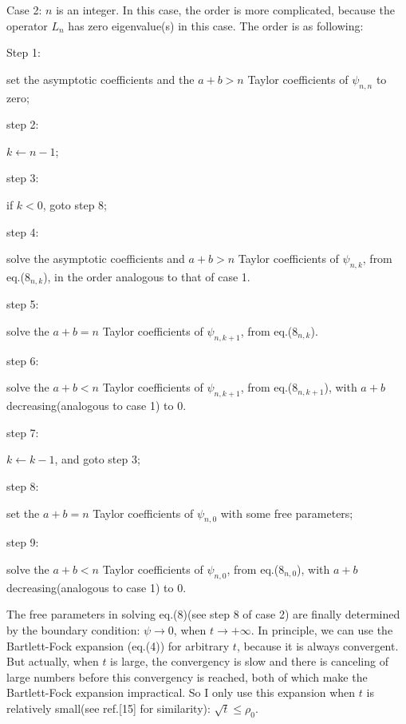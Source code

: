 Case 2: $n$ is an integer. In this case, the order is more complicated,
because the operator $L_{n}$ has zero eigenvalue(s) in this case. The order
is as following:

\vspace{0.5mm}
\noindent Step 1: \parbox[t]{146mm}
{set the asymptotic coefficients and the $a+b>n$ Taylor coefficients
of $\psi_{n,n}$ to zero;}

\vspace{1.5mm}
\noindent step 2: \parbox[t]{146mm}
{$k\gets n-1$;}

\vspace{1.5mm}
\noindent step 3: \parbox[t]{146mm}
{if $k<0$, goto step 8;}

\vspace{1.5mm}
\noindent step 4: \parbox[t]{146mm}
{solve the asymptotic coefficients and $a+b>n$ Taylor coefficients of
$\psi_{n,k}$, from eq.($8_{n,k}$), in the order analogous to that of case 1.}

\vspace{4mm}
\noindent step 5: \parbox[t]{146mm}
{solve the $a+b=n$ Taylor coefficients of $\psi_{n,k+1}$, from
eq.($8_{n,k}$).}

\vspace{1.5mm}
\noindent step 6: \parbox[t]{146mm}
{solve the $a+b<n$ Taylor coefficients of $\psi_{n,k+1}$, from
eq.($8_{n,k+1}$), with $a+b$ decreasing(analogous to case 1) to $0$.}

\vspace{4mm}
\noindent step 7: \parbox[t]{146mm}
{$k\gets k-1$, and goto step 3;}

\vspace{1.5mm}
\noindent step 8: \parbox[t]{146mm}
{set the $a+b=n$ Taylor coefficients of $\psi_{n,0}$ with some free
parameters;}

\vspace{1.7mm}
\noindent step 9: \parbox[t]{146mm}
{solve the $a+b<n$ Taylor coefficients of $\psi_{n,0}$,
from eq.($8_{n,0}$), with $a+b$ decreasing(analogous to case 1) to $0$.}

\vspace{4mm}
The free parameters in solving eq.(8)(see step 8 of case 2) are
finally determined by the boundary condition: $\psi\to 0$,
when $t\to +\infty$. In principle, we can use the Bartlett-Fock expansion
(eq.(4)) for arbitrary $t$, because it is always convergent. But actually,
when $t$ is large, the convergency is slow and there is canceling of large
numbers before this convergency is reached, both of which make
the Bartlett-Fock expansion impractical. So I only use this expansion when
$t$ is relatively small(see ref.[15] for similarity):
$\sqrt{t} \le \rho_{0}$.

